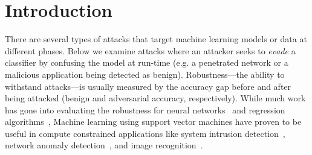 \documentclass[fonts]{icst}
\begin{document}

\maketitle




% 



\section{Introduction}
There are several types of attacks that target machine learning models or data at different phases. Below we examine attacks where an attacker seeks to \emph{evade} a classifier by confusing the model at run-time (e.g. a penetrated network or a malicious application being detected as benign). Robustness---the ability to withstand attacks---is usually measured by the accuracy gap before and after being attacked (benign and adversarial accuracy, respectively).  While much work has gone into evaluating the robustness for neural networks~\cite{szegedy2013intriguing,madry2017towards,croce2020reliable} and regression algorithms~\cite{deka2019adversarial}, 
Machine learning using support vector machines have proven to be useful in compute constrained applications like system intrusion detection~\cite{kim2003network}, network anomaly detection~\cite{mehmood2015svm}, and image recognition~\cite{tzotsos2008support}.
\end{document}
